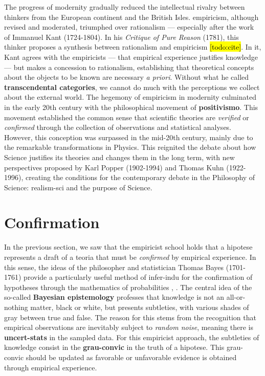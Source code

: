 \documentclass[./main_en.tex]{subfiles}
\begin{document}
\par The progress of modernity gradually reduced the intellectual rivalry between thinkers from the European continent and the British Isles. \gls{empiricism}, although revised and moderated, triumphed over \gls{rationalism} — especially after the work of Immanuel Kant (1724-1804). In his \textit{Critique of Pure Reason} (1781), this thinker proposes a synthesis between \gls{rationalism} and \gls{empiricism} \hl{[todo:cite]}. In it, Kant agrees with the empiricists — that empirical experience justifies knowledge — but makes a concession to \gls{rationalism}, establishing that theoretical concepts about the objects to be known are necessary \textit{a priori}. Without what he called \textbf{transcendental categories}, we cannot do much with the perceptions we collect about the external world. The hegemony of \gls{empiricism} in modernity culminated in the early 20th century with the philosophical movement of \textbf{\gls{positivismo}}. This movement established the common sense that scientific theories are \textit{verified} or \textit{confirmed} through the collection of observations and statistical analyses. However, this conception was surpassed in the mid-20th century, mainly due to the remarkable transformations in Physics. This reignited the debate about how Science justifies its theories and changes them in the long term, with new perspectives proposed by Karl Popper (1902-1994) and Thomas Kuhn (1922-1996), creating the conditions for the contemporary debate in the Philosophy of Science: \gls{realism-sci} and the purpose of Science.

\section{Confirmation} \label{sec:epis:bayes}

\par In the previous section, we saw that the empiricist school holds that a \gls{hipotese} represents a draft of a \gls{teoria} that must be \textit{confirmed} by empirical experience. In this sense, the ideas of the philosopher and statistician Thomas Bayes (1701-1761) provide a particularly useful method of \gls{infer-indu} for the confirmation of hypotheses through the mathematics of probabilities \cite{sep-epistemology-bayesian}, \cite{sprenger2019}. The central idea of the so-called \textbf{Bayesian epistemology} professes that knowledge is not an all-or-nothing matter, black or white, but presents subtleties, with various shades of gray between true and false. The reason for this stems from the recognition that empirical observations are inevitably subject to \textit{random noise}, meaning there is \textbf{\gls{uncert-stats}} in the sampled data. For this empiricist approach, the subtleties of knowledge consist in the \textbf{\gls{grau-convic}} in the truth of a \gls{hipotese}. This \gls{grau-convic} should be updated as favorable or unfavorable evidence is obtained through empirical experience.
\end{document}

